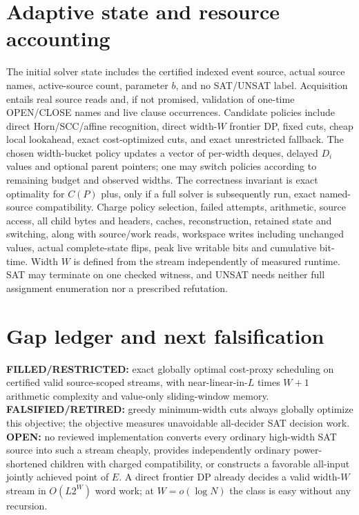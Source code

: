 \documentclass[11pt]{article}
\begin{document}
\section{Adaptive state and resource accounting}
The initial solver state includes the certified indexed event source, actual source names, active-source count, parameter $b$, and no SAT/UNSAT label. Acquisition entails real source reads and, if not promised, validation of one-time OPEN/CLOSE names and live clause occurrences. Candidate policies include direct Horn/SCC/affine recognition, direct width-$W$ frontier DP, fixed cuts, cheap local lookahead, exact cost-optimized cuts, and exact unrestricted fallback. The chosen width-bucket policy updates a vector of per-width deques, delayed $D_i$ values and optional parent pointers; one may switch policies according to remaining budget and observed widths. The correctness invariant is exact optimality for $C(P)$ plus, only if a full solver is subsequently run, exact named-source compatibility. Charge policy selection, failed attempts, arithmetic, source access, all child bytes and headers, caches, reconstruction, retained state and switching, along with source/work reads, workspace writes including unchanged values, actual complete-state flips, peak live writable bits and cumulative bit-time. Width $W$ is defined from the stream independently of measured runtime. SAT may terminate on one checked witness, and UNSAT needs neither full assignment enumeration nor a prescribed refutation.

\section{Gap ledger and next falsification}
\textbf{FILLED/RESTRICTED:} exact globally optimal cost-proxy scheduling on certified valid source-scoped streams, with near-linear-in-$L$ times $W+1$ arithmetic complexity and value-only sliding-window memory. \textbf{FALSIFIED/RETIRED:} greedy minimum-width cuts always globally optimize this objective; the objective measures unavoidable all-decider SAT decision work. \textbf{OPEN:} no reviewed implementation converts every ordinary high-width SAT source into such a stream cheaply, provides independently ordinary power-shortened children with charged compatibility, or constructs a favorable all-input jointly achieved point of $E$. A direct frontier DP already decides a valid width-$W$ stream in $O(L2^W)$ word work; at $W=o(\log N)$ the class is easy without any recursion.
\end{document}
